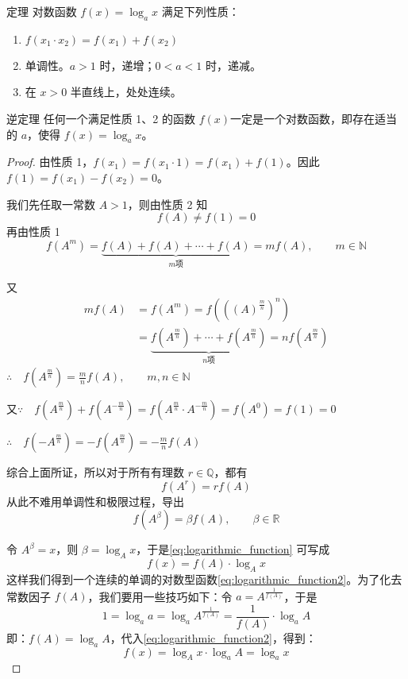 \begin{Theorem}{定理}
对数函数 $f(x)=\log_a x$ 满足下列性质：
  \begin{enumerate}
    \item $f(x_1\cdot x_2)=f(x_1)+f(x_2)$
    \item 单调性。$a>1$ 时，递增；$0<a<1$ 时，递减。
    \item 在 $x>0$ 半直线上，处处连续。
  \end{enumerate}
\end{Theorem}
 
\begin{Theorem}{逆定理} 
  任何一个满足性质 1、2 的函数 $f(x) $一定是一个对数函数，即存在适当的 $a$，使得 $f(x)=\log_a x$。
\end{Theorem}

\begin{proof}
由性质 1，$f(x_1)=f(x_1\cdot 1)=f(x_1)+f(1)$。因此 $f(1)=f(x_1)-f(x_2)=0$。

我们先任取一常数 $A>1$，则由性质 2 知
\[f(A)\ne f(1)=0\]
再由性质 1
\[f(A^m)=\underbrace{f(A)+f(A)+\cdots+f(A)}_{\text{$m$项}}=mf(A),\qquad m\in\mathbb{N}\]

又
\[\begin{split}
  mf(A)&=f(A^m)=f\left(\left((A)^{\tfrac{m}{n}}\right)^n\right)\\
  &=\underbrace{f\left(A^{\tfrac{m}{n}}\right)+\cdots+f\left(A^{\tfrac{m}{n}}\right)}_{\text{$n$项}}=nf\left(A^{\tfrac{m}{n}}\right)
\end{split} \]
$\therefore\quad f\left(A^{\tfrac{m}{n}}\right)=\frac{m}{n}f(A),\qquad m,n\in\mathbb{N}$

又$\because\quad f\left(A^{\tfrac{m}{n}}\right)+f\left(A^{-\tfrac{m}{n}}\right)=f\left(A^{\tfrac{m}{n}}\cdot A^{-\tfrac{m}{n}}\right)=f(A^0)=f(1)=0$

$\therefore\quad f\left(-A^{\tfrac{m}{n}}\right)=-f\left(A^{\tfrac{m}{n}}\right)=-\frac{m}{n}f(A)$

\bigskip
综合上面所证，所以对于所有有理数 $r\in\mathbb{Q}$，都有
\[f(A^r)=rf(A)\]
从此不难用单调性和极限过程，导出
\begin{equation}
  \label{eq:logarithmic_function}
  f(A^{\beta })=\beta f(A),\qquad \beta \in\mathbb{R}
\end{equation}

令 $A^{\beta }=x$，则 $\beta =\log_A x$，于是\cref{eq:logarithmic_function} 可写成
\begin{equation}
  \label{eq:logarithmic_function2}
  f(x)=f(A)\cdot \log_A x
\end{equation}
这样我们得到一个连续的单调的对数型函数\cref{eq:logarithmic_function2}。为了化去常数因子 $f(A)$，我们要用一些技巧如下：令 $a=A^{\tfrac{1}{f(A)}}$，于是
\[1=\log_a a=\log_a A^{\tfrac{1}{f(A)}}=\frac{1}{f(A)}\cdot \log_a A\]
即：$f(A)=\log_a A$，代入\cref{eq:logarithmic_function2}，得到：
\[f(x)=\log_A x\cdot \log_a A=\log_a x\]
\end{proof}

